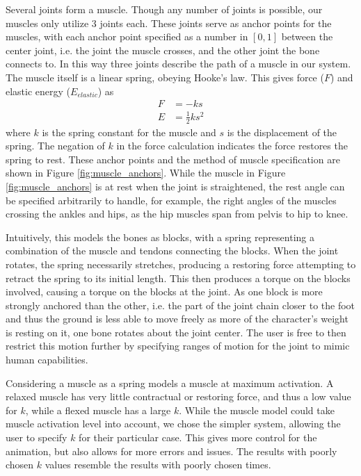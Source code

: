 Several joints form a muscle.  Though any number of joints is possible, our muscles only utilize 3 joints each.  These joints serve as anchor points for the muscles, with each anchor point specified as a number in $[0, 1]$ between the center joint, i.e. the joint the muscle crosses, and the other joint the bone connects to.  In this way three joints describe the path of a muscle in our system.  The muscle itself is a linear spring, obeying Hooke's law.  This gives force ($F$) and elastic energy ($E_{elastic}$) as
\begin{align*}
	F &= -ks \\
	E &= \frac{1}{2} k s^2
\end{align*}
where $k$ is the spring constant for the muscle and $s$ is the displacement of the spring.  The negation of $k$ in the force calculation indicates the force restores the spring to rest.  These anchor points and the method of muscle specification are shown in Figure \ref{fig:muscle_anchors}.  While the muscle in Figure \ref{fig:muscle_anchors} is at rest when the joint is straightened, the rest angle can be specified arbitrarily to handle, for example, the right angles of the muscles crossing the ankles and hips, as the hip muscles span from pelvis to hip to knee.

Intuitively, this models the bones as blocks, with a spring representing a combination of the muscle and tendons connecting the blocks.  When the joint rotates, the spring necessarily stretches, producing a restoring force attempting to retract the spring to its initial length.  This then produces a torque on the blocks involved, causing a torque on the blocks at the joint.  As one block is more strongly anchored than the other, i.e. the part of the joint chain closer to the foot and thus the ground is less able to move freely as more of the character's weight is resting on it, one bone rotates about the joint center.  The user is free to then restrict this motion further by specifying ranges of motion for the joint to mimic human capabilities.

Considering a muscle as a spring models a muscle at maximum activation.  A relaxed muscle has very little contractual or restoring force, and thus a low value for $k$, while a flexed muscle has a large $k$.  While the muscle model could take muscle activation level into account, we chose the simpler system, allowing the user to specify $k$ for their particular case.  This gives more control for the animation, but also allows for more errors and issues.  The results with poorly chosen $k$ values resemble the results with poorly chosen times.

